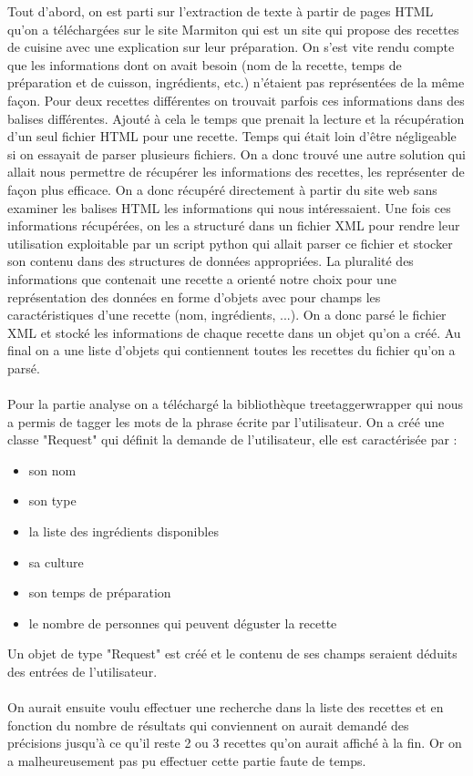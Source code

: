 \documentclass{report}
\begin{document}
Tout d'abord, on est parti sur l'extraction de texte à partir de pages HTML qu'on a téléchargées sur le site Marmiton qui est un site qui propose des recettes de cuisine avec une explication sur leur préparation. On s'est vite rendu compte que les informations dont on avait besoin (nom de la recette, temps de préparation et de cuisson, ingrédients, etc.) n'étaient pas représentées de la même façon. Pour deux recettes différentes on trouvait parfois ces informations dans des balises différentes. Ajouté à cela le temps que prenait la lecture et la récupération d'un seul fichier HTML pour une recette. Temps qui était loin d'être négligeable si on essayait de parser plusieurs fichiers. On a donc trouvé une autre solution qui allait nous permettre de récupérer les informations des recettes, les représenter de façon plus efficace. On a donc récupéré directement à partir du site web sans examiner les balises HTML les informations qui nous intéressaient. Une fois ces informations récupérées, on les a structuré dans un fichier XML pour rendre leur utilisation exploitable par un script python qui allait parser ce fichier et stocker son contenu dans des structures de données appropriées. La pluralité des informations que contenait une recette a orienté notre choix pour une représentation des données en forme d'objets avec pour champs les caractéristiques d'une recette (nom, ingrédients, ...). On a donc parsé le fichier XML et stocké les informations de chaque recette dans un objet qu'on a créé. Au final on a une liste d'objets qui contiennent toutes les recettes du fichier qu'on a parsé. \\ \\
Pour la partie analyse on a téléchargé la bibliothèque treetaggerwrapper qui nous a permis de tagger les mots de la phrase écrite par l'utilisateur. On a créé une classe "Request" qui définit la demande de l'utilisateur, elle est caractérisée par : 
\begin{itemize}
\item son nom
\item son type
\item la liste des ingrédients disponibles
\item sa culture
\item son temps de préparation 
\item le nombre de personnes qui peuvent déguster la recette
\end{itemize}
Un objet de type "Request" est créé et le contenu de ses champs seraient déduits des entrées de l'utilisateur. \\ \\ 
On aurait ensuite voulu effectuer une recherche dans la liste des recettes et en fonction du nombre de résultats qui conviennent on aurait demandé des précisions jusqu'à ce qu'il reste 2 ou 3 recettes qu'on aurait affiché à la fin. Or on a malheureusement pas pu effectuer cette partie faute de temps.
\end{document}

